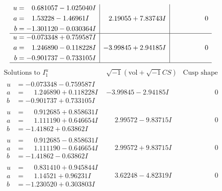\documentclass[1p]{elsarticle_modified}
\theoremstyle{definition}
\newcommand{\I}{\sqrt{-1}}
\begin{document}
$$\begin{array}{c|c|c}
\begin{aligned}
u &= \phantom{-}0.681057 - 1.025040 I \\
a &= \phantom{-}1.53228 - 1.46961 I \\
b &= -1.301120 - 0.030364 I\end{aligned}
 & \phantom{-}2.19055 + 7.83743 I & \phantom{-0.000000 } 0 \\ \hline\begin{aligned}
u &= -0.073348 + 0.759587 I \\
a &= \phantom{-}1.246890 - 0.118228 I \\
b &= -0.901737 - 0.733105 I\end{aligned}
 & -3.99845 + 2.94185 I & \phantom{-0.000000 } 0\\
 \hline 
 \end{array}$$\newpage$$\begin{array}{c|c|c}  
\text{Solutions to }I^u_{1}& \I (\text{vol} + \sqrt{-1}CS) & \text{Cusp shape}\\
 \hline 
\begin{aligned}
u &= -0.073348 - 0.759587 I \\
a &= \phantom{-}1.246890 + 0.118228 I \\
b &= -0.901737 + 0.733105 I\end{aligned}
 & -3.99845 - 2.94185 I & \phantom{-0.000000 } 0 \\ \hline\begin{aligned}
u &= \phantom{-}0.912685 + 0.858631 I \\
a &= \phantom{-}1.111190 + 0.646654 I \\
b &= -1.41862 + 0.63862 I\end{aligned}
 & \phantom{-}2.99572 - 9.83715 I & \phantom{-0.000000 } 0 \\ \hline\begin{aligned}
u &= \phantom{-}0.912685 - 0.858631 I \\
a &= \phantom{-}1.111190 - 0.646654 I \\
b &= -1.41862 - 0.63862 I\end{aligned}
 & \phantom{-}2.99572 + 9.83715 I & \phantom{-0.000000 } 0 \\ \hline\begin{aligned}
u &= \phantom{-}0.831410 + 0.945844 I \\
a &= \phantom{-}1.14521 + 0.96231 I \\
b &= -1.230520 + 0.303803 I\end{aligned}
 & \phantom{-}3.62248 - 4.82319 I & \phantom{-0.000000 } 0 \\ \hline\begin{aligned}

\end{aligned}
\end{array}$$
\end{document}
